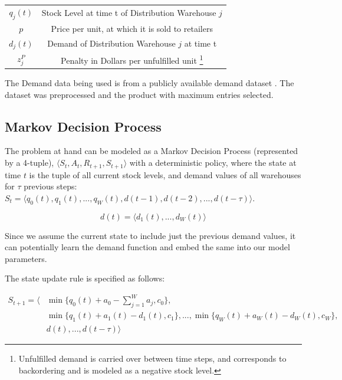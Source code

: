 \documentclass{article}
\begin{document}
\begin{table}[h!]
\begin{tabular}{ c | c }
        $q_j(t)$ & Stock Level at time t of Distribution Warehouse $j$                                                                                                                                 \\
        $p$      & Price per unit, at which it is sold to retailers                                                                                                                                    \\
        $d_j(t)$ & Demand of Distribution Warehouse $j$ at time t                                                                                                                                      \\
        $z_j^P$  & Penalty in Dollars per unfulfilled unit \footnote{Unfulfilled demand is carried over between time steps, and corresponds to backordering and is modeled as a negative stock level.} \\
        \hline
    \end{tabular}
    \label{tab:table}
\end{table}


The Demand data being used is from a publicly available demand dataset \cite{zhao_product_2017}. The dataset was preprocessed and the product with maximum entries selected.


\subsection{Markov Decision Process}

The problem at hand can be modeled as a Markov Decision Process (represented by a 4-tuple), $\langle S_t, A_t, R_{t+1}, S_{t+1} \rangle$  with a deterministic policy, where the state at time $t$ is the tuple of all current stock levels, and demand values of all warehouses for $\tau$ previous steps: $S_t = \langle q_0(t), q_1(t), ..., q_W(t), d(t-1), d(t-2), ..., d(t-\tau) \rangle$.

\begin{equation}
    d(t) = \langle d_1(t), ..., d_W(t) \rangle
\end{equation}

Since we assume the current state to include just the previous demand values, it can potentially learn the demand function and embed the same into our model parameters.

The state update rule is specified as follows:

\begin{equation}
    \begin{split}
        S_{t+1} = \langle & \min \{ q_0(t) + a_0 - \sum_{j = 1}^W a_j, c_0 \}, \\
        & \min \{ q_1(t) + a_1(t) - d_1(t), c_1 \}, ..., \min \{ q_W(t) + a_W(t) - d_W(t), c_W \}, \\
        & d(t), ..., d(t - \tau) \rangle
    \end{split}
\end{equation}
\end{document}
